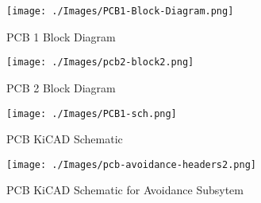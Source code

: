 \begin{figure}[H]
	\centering
	\texttt{[image: ./Images/PCB1-Block-Diagram.png]}
	\caption{\label{fig:pcb}PCB 1 Block Diagram}
\end{figure}

\begin{figure}[H]
	\centering
	\texttt{[image: ./Images/pcb2-block2.png]}
	\caption{\label{fig:pcb2}PCB 2 Block Diagram}
\end{figure}

\begin{figure}[H]
	\centering
	\texttt{[image: ./Images/PCB1-sch.png]}
	\caption{\label{fig:pcb-sch}PCB KiCAD Schematic}
\end{figure}


\begin{figure}[H]
	\centering
	\texttt{[image: ./Images/pcb-avoidance-headers2.png]}
	\caption{\label{fig:pcb-motor}PCB KiCAD Schematic for Avoidance Subsytem}
\end{figure}

